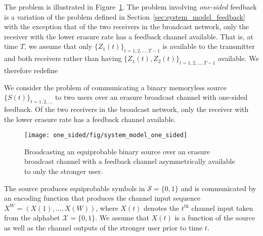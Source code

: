 The problem is illustrated in Figure~\ref{fig:system_model_one_sided}.  The problem involving \emph{one-sided} feedback is a variation of the problem defined in Section~\ref{sec:system_model_feedback} with the exception that of the two receivers in the broadcast network, only the receiver with the lower erasure rate has a feedback channel available.  That is, at time $T$, we assume that only $\{Z_1(t)\}_{t=1, 2, \ldots, T-1}$ is available to the transmitter and both receivers rather than having $\{Z_1(t), Z_2(t)\}_{t=1, 2, \ldots, T-1}$ available.  We therefore redefine 

We consider the problem of communicating a binary memoryless source $\{S(t)\}_{t=1,2, \ldots}$ to two users over an erasure broadcast channel with one-sided feedback.  Of the two receivers in the broadcast network, only the receiver with the lower erasure rate has a feedback channel available. %
%
\begin{figure}
	\centering
%	
	\texttt{[image: one\_sided/fig/system\_model\_one\_sided]}
	\caption{Broadcasting an equiprobable binary source over an erasure broadcast channel with a feedback channel asymmetrically available to only the stronger user.}
	\label{fig:system_model_one_sided}
\end{figure}
%
The source produces equiprobable symbols in $\mathcal{S}=\{0,1\}$ and is communicated by an encoding function that produces the channel input sequence $X^{W} = (X(1),  \dots , X(W))$, where $X(t)$ denotes the $t^{\mathrm{th}}$ channel input taken from the alphabet $\mathcal{X} = \{0, 1\}$.  We assume that 
$X(t)$ is a function of the source as well as the channel outputs of the stronger user prior to time $t$.  

